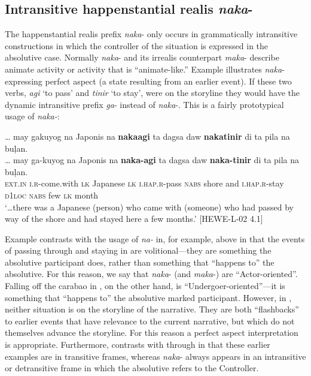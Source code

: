 \subsection{Intransitive happenstantial realis \textit{naka}{}-}
\label{bkm:Ref447381050}\label{sec:intransitivehappenstantialrealis}

The happenstantial realis prefix \textit{naka}- only occurs in grammatically intransitive constructions in which the controller of the situation is expressed in the absolutive case. Normally \textit{naka}- and its irrealis counterpart \textit{maka}- describe animate activity or activity that is “animate-like.” Example  illustrates \textit{naka}{}- expressing perfect aspect (a state resulting from an earlier event). If these two verbs, \textit{agi} ‘to pass’ and \textit{tinir} ‘to stay’, were on the storyline they would have the dynamic intransitive prefix \textit{ga}{}- instead of \textit{naka}\nobreakdash-. This is a fairly prototypical usage of \textit{naka-}:

\ea
\label{bkm:Ref447862310}
… may  gakuyog  na  Japonis  na \textbf{nakaagi}  ta  dagsa daw  \textbf{nakatinir}  di  ta  pila  na  buļan. \\\smallskip
 \gll … may  ga-kuyog  na  Japonis  na \textbf{naka-agi}  ta  dagsa daw  \textbf{naka-tinir}  di  ta  pila  na  buļan. \\
{} \textsc{ext.in}  \textsc{i.r}-come.with  \textsc{lk}  Japanese  \textsc{lk}  \textsc{i.hap.r}-pass  \textsc{nabs}  shore
and  \textsc{i.hap.r}-stay  \textsc{d}1\textsc{loc}  \textsc{nabs}  few  \textsc{lk}  month \\
\glt `…there was a Japanese (person) who came with (someone) who had passed by way of the shore and had stayed here a few months.’ [HEWE-L-02 4.1]
\z

Example  contrasts with the usage of \textit{na-} in, for example,  above in that the events of passing through and staying in  are volitional---they are something the absolutive participant does, rather than something that “happens to” the absolutive. For this reason, we say that \textit{naka}{}- (and \textit{maka}{}-) are “Actor-oriented”. Falling off the carabao in , on the other hand, is “Undergoer-orien\-ted”---it is something that “happens to” the absolutive marked participant. However, in , neither situation is on the storyline of the narrative. They are both “flashbacks” to earlier events that have relevance to the current narrative, but which do not themselves advance the storyline. For this reason a perfect aspect interpretation is appropriate.  Furthermore,  contrasts with  through  in that these earlier examples are in transitive frames, whereas \textit{naka}- always appears in an intransitive or detransitive frame in which the absolutive refers to the Controller.


